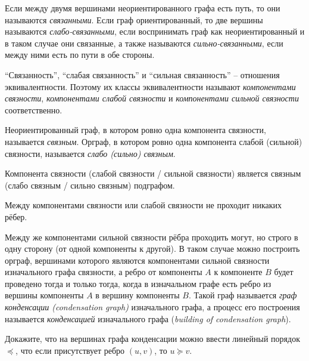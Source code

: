 \documentclass[12pt,a4paper]{article}
\begin{document}
    \begin{definition}
        Если между двумя вершинами неориентированного графа есть путь, то они называются \emph{связанными}. Если граф ориентированный, то две вершины называются \emph{слабо-связанными}, если воспринимать граф как неориентированный и в таком случае они связанные, а также называются \emph{сильно-связанными}, если между ними есть по пути в обе стороны.

        ``Связанность'', ``слабая связанность'' и ``сильная связанность'' -- отношения эквивалентности. Поэтому их классы эквивалентности называют \emph{компонентами связности}, \emph{компонентами слабой связности} и \emph{компонентами сильной связности} соответственно.

        Неориентированный граф, в котором ровно одна компонента связности, называется \emph{связным}. Орграф, в котором ровно одна компонента слабой (сильной) связности, называется \emph{слабо (сильно) связным}.
    \end{definition}

    \begin{statement}
        Компонента связности (слабой связности / сильной связности) является связным (слабо связным / сильно связным) подграфом.
    \end{statement}

    \begin{remark}
        Между компонентами связности или слабой связности не проходит никаких рёбер.
        
        Между же компонентами сильной связности рёбра проходить могут, но строго в одну сторону (от одной компоненты к другой). В таком случае можно построить орграф, вершинами которого являются компонентами сильной связности изначального графа связности, а ребро от компоненты $A$ к компоненте $B$ будет проведено тогда и только тогда, когда в изначальном графе есть ребро из вершины компоненты $A$ в вершину компоненты $B$. Такой граф называется \emph{граф конденсации (condensation graph)} изначального графа, а процесс его построения называется \emph{конденсацией} изначального графа (\emph{building of condensation graph}).
    \end{remark}

    \begin{exercise*}
        Докажите, что на вершинах графа конденсации можно ввести линейный порядок $\preccurlyeq$, что если присутствует ребро $(u, v)$, то $u \succcurlyeq v$.
    \end{exercise*}
\end{document}
